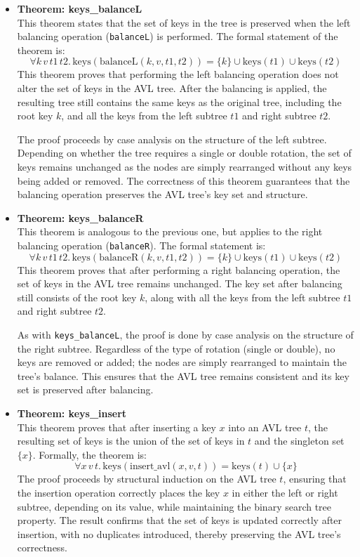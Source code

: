 \documentclass[12pt]{article}
\begin{document}
\begin{itemize}
\begin{itemize}

\item \textbf{Theorem: keys\_balanceL} \\
  This theorem states that the set of keys in the tree is preserved when the left balancing operation (\texttt{balanceL}) is performed. The formal statement of the theorem is:
  \[
  \forall k \, v \, t1 \, t2. \, \text{keys}(\text{balanceL}(k, v, t1, t2)) = \{k\} \cup \text{keys}(t1) \cup \text{keys}(t2)
  \]
  This theorem proves that performing the left balancing operation does not alter the set of keys in the AVL tree. After the balancing is applied, the resulting tree still contains the same keys as the original tree, including the root key \( k \), and all the keys from the left subtree \( t1 \) and right subtree \( t2 \).

  The proof proceeds by case analysis on the structure of the left subtree. Depending on whether the tree requires a single or double rotation, the set of keys remains unchanged as the nodes are simply rearranged without any keys being added or removed. The correctness of this theorem guarantees that the balancing operation preserves the AVL tree's key set and structure.

\item \textbf{Theorem: keys\_balanceR} \\
  This theorem is analogous to the previous one, but applies to the right balancing operation (\texttt{balanceR}). The formal statement is:
  \[
  \forall k \, v \, t1 \, t2. \, \text{keys}(\text{balanceR}(k, v, t1, t2)) = \{k\} \cup \text{keys}(t1) \cup \text{keys}(t2)
  \]
  This theorem proves that after performing a right balancing operation, the set of keys in the AVL tree remains unchanged. The key set after balancing still consists of the root key \( k \), along with all the keys from the left subtree \( t1 \) and right subtree \( t2 \).

  As with \texttt{keys\_balanceL}, the proof is done by case analysis on the structure of the right subtree. Regardless of the type of rotation (single or double), no keys are removed or added; the nodes are simply rearranged to maintain the tree’s balance. This ensures that the AVL tree remains consistent and its key set is preserved after balancing.

\item \textbf{Theorem: keys\_insert} \\
  This theorem proves that after inserting a key \( x \) into an AVL tree \( t \), the resulting set of keys is the union of the set of keys in \( t \) and the singleton set \( \{x\} \). Formally, the theorem is:
  \[
  \forall x \, v \, t. \, \text{keys}(\text{insert\_avl}(x, v, t)) = \text{keys}(t) \cup \{x\}
  \]
  The proof proceeds by structural induction on the AVL tree \( t \), ensuring that the insertion operation correctly places the key \( x \) in either the left or right subtree, depending on its value, while maintaining the binary search tree property. The result confirms that the set of keys is updated correctly after insertion, with no duplicates introduced, thereby preserving the AVL tree's correctness.


\end{itemize}
\end{itemize}
\end{document}
